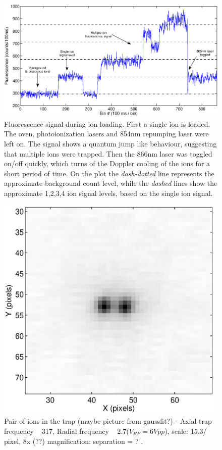 \begin{figure}[h!t]
\centering
\includegraphics[width=14.5cm]{chapter6/multiload/multiload3}
\caption[Fluorescence signal of multiple loaded ions]{Fluorescence signal during ion loading. First a single ion is loaded. The \CaI{} oven, photoionization lasers and 854nm repumping laser were left on.  The signal shows a quantum jump like  behaviour, suggesting that multiple ions were trapped. Then the 866nm laser was toggled on/off quickly, which turns of the Doppler cooling of the ions for a short period of time. On the plot the \textit{dash-dotted} line represents the approximate background count level, while the \textit{dashed} lines show the approximate 1,2,3,4 ion signal levels, based on the single ion signal.}
\label{multiload}
\end{figure} 


\begin{figure}[h!t]
\centering
\includegraphics[width=11cm]{chapter6/twinion/twinionpic}
\caption[]{Pair of ions in the trap (maybe picture from gaussfit?) - Axial trap frequency ~ 317\kHz, Radial frequency ~ 2.7\MHz ($V_{RF} = 6Vpp$), scale: 15.3\um / pixel, 8x (??) magnification: separation = ? \um. }
\label{pairions}
\end{figure} 







